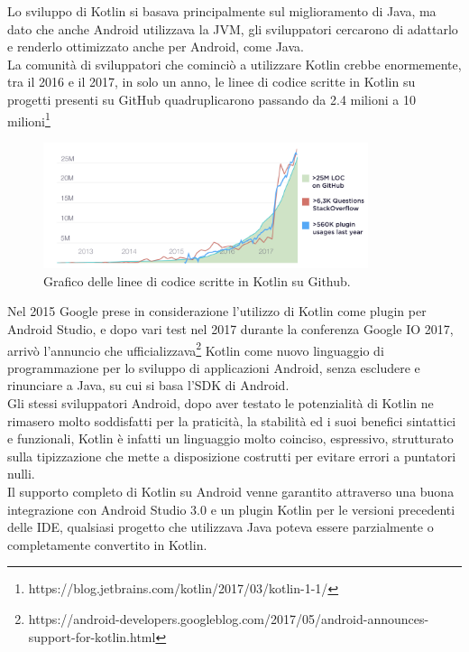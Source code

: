 Lo sviluppo di Kotlin si basava principalmente sul miglioramento di Java, ma dato che anche Android utilizzava la JVM, gli sviluppatori cercarono di adattarlo e renderlo ottimizzato anche per Android, come Java.\\
La comunità di sviluppatori che cominciò a utilizzare Kotlin crebbe enormemente, tra il 2016 e il 2017, in solo un anno, le linee di codice scritte in Kotlin su progetti presenti su GitHub quadruplicarono passando da 2.4 milioni a 10 milioni\footnote{https://blog.jetbrains.com/kotlin/2017/03/kotlin-1-1/} \\

\begin{figure}[!hb]
  \centering
  \includegraphics[width=0.85\textwidth]{immagini/kotlin_grafico_incremento.png}
  \caption{Grafico delle linee di codice scritte in Kotlin su Github.}\label{fig:Grafico delle linee di codice scritte in Kotlin su Github}
\end{figure}

Nel 2015 Google prese in considerazione l'utilizzo di Kotlin come plugin per Android Studio, e dopo vari test nel 2017 durante la conferenza Google IO 2017, arrivò l'annuncio che ufficializzava\footnote{https://android-developers.googleblog.com/2017/05/android-announces-support-for-kotlin.html} Kotlin come nuovo linguaggio di programmazione per lo sviluppo di applicazioni Android, senza escludere e rinunciare a Java, su cui si basa l'SDK di Android.\\
Gli stessi sviluppatori Android, dopo aver testato le potenzialità di Kotlin ne rimasero molto soddisfatti per la praticità, la stabilità ed i suoi benefici sintattici e funzionali, Kotlin è infatti un linguaggio molto coinciso, espressivo, strutturato sulla tipizzazione che mette a disposizione costrutti per evitare errori a puntatori nulli.\\
Il supporto completo di Kotlin su Android venne garantito attraverso una buona integrazione con Android Studio 3.0 e un plugin Kotlin per le versioni precedenti delle IDE, qualsiasi progetto che utilizzava Java poteva essere parzialmente o completamente convertito in Kotlin.





